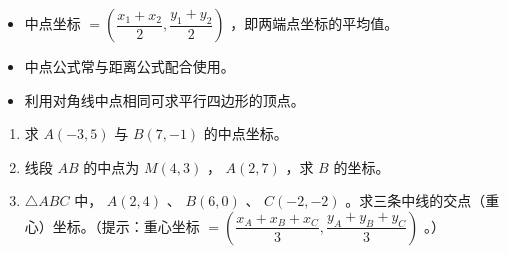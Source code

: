 \begin{keytakeaway}


\begin{itemize}
  \item 中点坐标 $= \left(\dfrac{x_1+x_2}{2}, \dfrac{y_1+y_2}{2}\right)$ ，即两端点坐标的平均值。
  \item 中点公式常与距离公式配合使用。
  \item 利用对角线中点相同可求平行四边形的顶点。
\end{itemize}


\end{keytakeaway}

\begin{practice}


\begin{enumerate}
  \item 求 $A(-3, 5)$ 与 $B(7, -1)$ 的中点坐标。
  \item 线段 $AB$ 的中点为 $M(4, 3)$ ， $A(2, 7)$ ，求 $B$ 的坐标。
  \item $\triangle ABC$ 中， $A(2, 4)$ 、 $B(6, 0)$ 、 $C(-2, -2)$ 。求三条中线的交点（重心）坐标。（提示：重心坐标 $= \left(\dfrac{x_A+x_B+x_C}{3}, \dfrac{y_A+y_B+y_C}{3}\right)$ 。）
\end{enumerate}


\end{practice}



